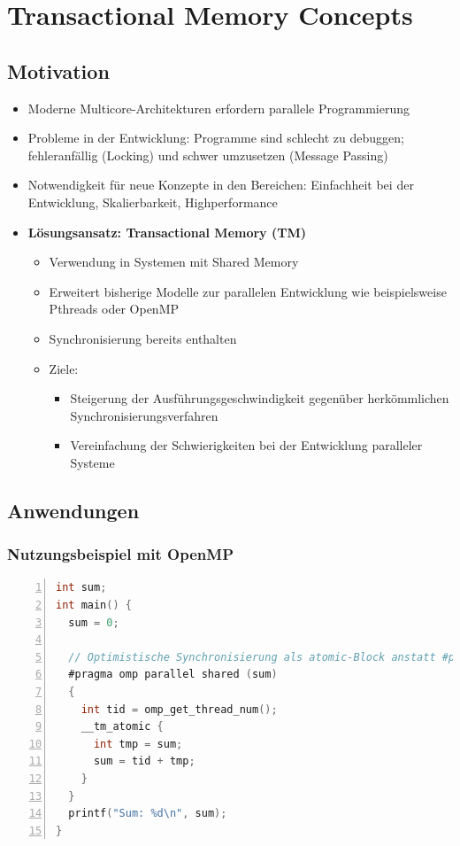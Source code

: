 \section{Transactional Memory Concepts}

\subsection{Motivation}
\begin{itemize}
	\item Moderne Multicore-Architekturen erfordern parallele Programmierung
	\item Probleme in der Entwicklung: Programme sind schlecht zu debuggen; fehleranfällig (Locking) und schwer umzusetzen (Message Passing)
	\item Notwendigkeit für neue Konzepte in den Bereichen: Einfachheit bei der Entwicklung, Skalierbarkeit, Highperformance
	\item \textbf{Lösungsansatz: Transactional Memory (TM)}
	\begin{itemize}
		\item Verwendung in Systemen mit Shared Memory
		\item Erweitert bisherige Modelle zur parallelen Entwicklung wie beispielsweise Pthreads oder OpenMP
		\item Synchronisierung bereits enthalten
		\item Ziele:
		\begin{itemize}
			\item Steigerung der Ausführungsgeschwindigkeit gegenüber herkömmlichen Synchronisierungsverfahren
			\item Vereinfachung der Schwierigkeiten bei der Entwicklung paralleler Systeme
		\end{itemize}
	\end{itemize}
\end{itemize}


\subsection{Anwendungen}

\subsubsection{Nutzungsbeispiel mit OpenMP}
\begin{minipage}{\linewidth}
\lstset{language=Python}  
\begin{lstlisting}[frame=single,numbers=left,mathescape,keepspaces=true,showstringspaces=false,language=C]
int sum;
int main() {
  sum = 0;

  // Optimistische Synchronisierung als atomic-Block anstatt #pragma omp critical
  #pragma omp parallel shared (sum)
  {
    int tid = omp_get_thread_num();
    __tm_atomic {
      int tmp = sum;
      sum = tid + tmp;
    }
  }
  printf("Sum: %d\n", sum);
}
\end{lstlisting}
\end{minipage}


